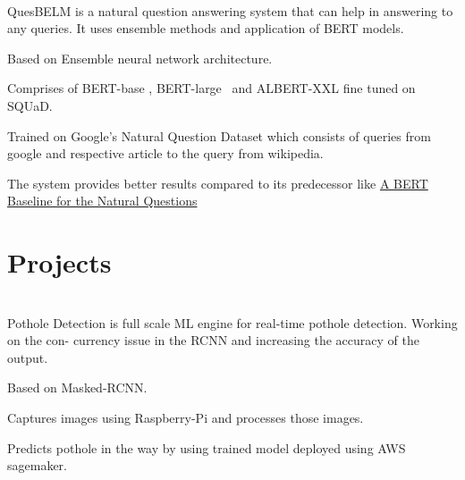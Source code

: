 \documentclass[]{deedy-resume-openfont}
\begin{document}
\begin{minipage}[t]{0.66\textwidth}
\\
QuesBELM is a natural question answering system that can help in answering to any queries. It uses ensemble methods and application of BERT models. \\
\begin{tightemize}
\item Based on Ensemble neural network architecture. \\
\item Comprises of BERT-base , BERT-large \ and ALBERT-XXL fine tuned on SQUaD. \\
\item Trained on Google's Natural Question Dataset which consists of queries from google and respective article to the query from wikipedia. \\
\item The system provides better results compared to its predecessor like \href{https://arxiv.org/pdf/1901.08634.pdf}{{A BERT Baseline for the Natural Questions}}
\end{tightemize}
\sectionsep


\section{Projects}

\\
Pothole Detection is full scale ML engine for real-time pothole detection.
Working on the con- currency issue in the RCNN and increasing the accuracy
of the output.\\

\begin{tightemize}
\item Based on Masked-RCNN. \\
\item Captures images using Raspberry-Pi and processes those images. \\
\item Predicts pothole in the way by using trained model deployed using AWS sagemaker. \\

\end{tightemize}
\sectionsep



\end{minipage}
\end{document}
